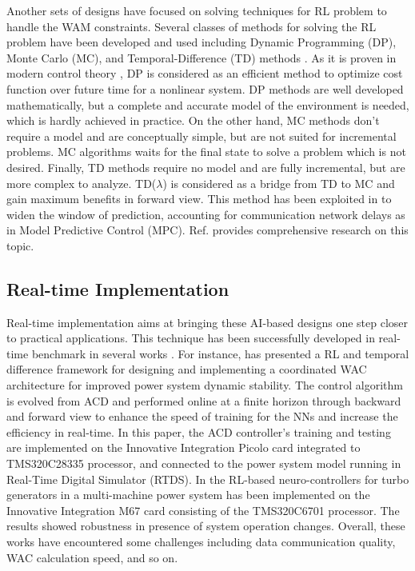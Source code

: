 \documentclass[journal]{IEEEtran}
\begin{document}
Another sets of designs have focused on solving techniques for RL problem to handle the WAM constraints. Several classes of methods for solving the RL problem have been developed and used including Dynamic Programming (DP), Monte Carlo (MC), and Temporal-Difference (TD) methods \cite{Prokhorov1997a, DP}. As it is proven in modern control theory \cite{Werbos2000a}, DP is considered as an efficient method to optimize cost function over future time for a nonlinear system. DP methods are well developed mathematically, but a complete and accurate model of the environment is needed, which is hardly achieved in practice. On the other hand, MC methods don't require a model and are conceptually simple, but are not suited for incremental problems. MC algorithms waits for the final state to solve a problem which is not desired. Finally, TD methods require no model and are fully incremental, but are more complex to analyze\cite{Sutton1998a}. TD($\lambda$) is considered as a bridge from TD to MC and gain maximum benefits in forward view. This method has been exploited in \cite{7185402} to widen the window of prediction, accounting for communication network delays as in Model Predictive Control (MPC). Ref. \cite{Sutton1998a} provides comprehensive research on this topic. 


\subsection{Real-time Implementation}
Real-time implementation aims at bringing these AI-based designs one step closer to practical applications. This technique has been successfully developed in real-time benchmark in several works \cite{4436106, 4162611, 7185402, KumarDHP}. For instance, \cite{7185402} has presented a  RL and temporal difference framework for designing and implementing a coordinated WAC architecture for improved power system dynamic stability. The control algorithm is evolved from ACD and performed online at a finite horizon through backward and forward view to enhance the speed of training for the NNs and increase the efficiency in real-time. In this paper, the ACD controller's training and testing are implemented on the Innovative Integration Picolo card integrated to TMS320C28335 processor, and connected to the power system model running in Real-Time Digital Simulator (RTDS). In \cite{KumarDHP} the RL-based neuro-controllers for turbo generators in a multi-machine power system has been implemented on the Innovative Integration M67 card consisting of the TMS320C6701 processor. The results showed robustness in presence of system operation changes. Overall, these works have encountered some challenges including data communication quality, WAC calculation speed, and so on. 
\end{document}
